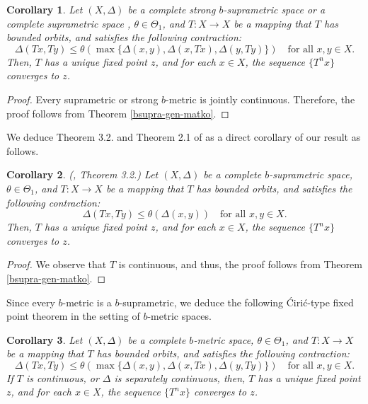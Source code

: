 \documentclass[pdflatex,sn-mathphys-num]{sn-jnl}%
\theoremstyle{thmstyleone}%
\newtheorem{cor}{Corollary}%
\theoremstyle{thmstyletwo}%
\theoremstyle{thmstylethree}%
\begin{document}
                    
\begin{cor}\label{strong-bsupra-gen-matko}
Let \((X, \Delta)\) be a complete strong \(b\)-suprametric space or a complete suprametric space  , \(\theta\in \Theta_{1}\), and \(T : X \to X\) be a mapping that  $T$ has bounded orbits, and satisfies the following contraction:
\begin{equation}
\Delta(Tx, Ty) \leq \theta(\max\{\Delta(x, y),\Delta(x, Tx),\Delta( y,Ty)\})\quad \text{for all } x,y\in X.
\end{equation}
Then, \(T\) has a unique fixed point \(z\), and for each \(x \in X\), the sequence \(\{T^n x\}\) converges to \(z\).
\end{cor}
\begin{proof}Every suprametric or strong \(b\)-metric  is jointly continuous. Therefore, the proof follows from Theorem \ref{bsupra-gen-matko}.
\end{proof}
We deduce  Theorem 3.2. \cite{berzig2024nonlinear} and Theorem 2.1 of \cite{berzig2024strong} as a direct corollary of our result as follows.
\begin{cor}(\cite{berzig2024nonlinear}, Theorem 3.2.)
Let \((X, \Delta)\) be a complete \(b\)-suprametric space, \(\theta\in \Theta_{1}\), and \(T : X \to X\) be a mapping that $T$ has bounded orbits, and satisfies the following contraction:
\begin{equation}
\Delta(Tx, Ty) \leq \theta(\Delta(x, y))\quad \text{for all } x,y\in X\nonumber.
\end{equation}
 Then, \(T\) has a unique fixed point \(z\), and for each \(x \in X\), the sequence \(\{T^n x\}\) converges to \(z\).
\end{cor}
\begin{proof}
We observe that \(T\) is continuous, and thus, the proof follows from Theorem \ref{bsupra-gen-matko}.
\end{proof}
Since every \(b\)-metric is a \(b\)-suprametric, we deduce the following {\'C}iri{\'c}-type fixed point theorem in the setting of \(b\)-metric spaces.
\begin{cor}\label{cirictype-bmetric}
Let \((X, \Delta)\) be a complete \(b\)-metric space, \(\theta\in \Theta_{1}\), and \(T : X \to X\) be a mapping that $T$ has bounded orbits, and  satisfies the following contraction:
\begin{equation}
\Delta(Tx, Ty) \leq \theta(\max\{\Delta(x, y),\Delta(x, Tx),\Delta( y,Ty)\})\quad \text{for all } x,y\in X\nonumber.
\end{equation}
 If \(T\) is continuous, or $\Delta$ is separately continuous,  then, \(T\) has a unique fixed point \(z\), and for each \(x \in X\), the sequence \(\{T^n x\}\) converges to \(z\).
\end{cor}
\end{document}
